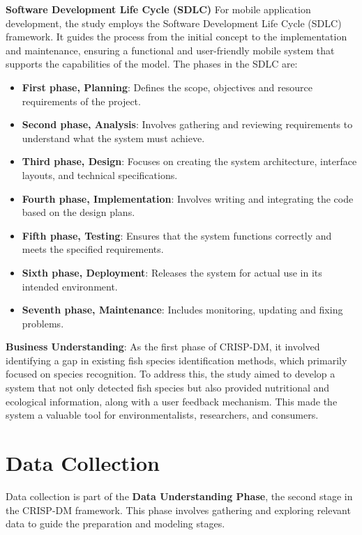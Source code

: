 \noindent\textbf{Software Development Life Cycle (SDLC)}\newline
For mobile application development, the study employs the Software Development Life Cycle (SDLC) framework. It guides the process from the initial concept to the implementation and maintenance, ensuring a functional and user-friendly mobile system that supports the capabilities of the model. The phases in the SDLC are:

\begin{itemize}
    \item\textbf{First phase, Planning}: Defines the scope, objectives and resource requirements of the project.
    \item\textbf{Second phase, Analysis}: Involves gathering and reviewing requirements to understand what the system must achieve.
    \item\textbf{Third phase, Design}: Focuses on creating the system architecture, interface layouts, and technical specifications.
    \item\textbf{Fourth phase, Implementation}: Involves writing and integrating the code based on the design plans.
    \item\textbf{Fifth phase, Testing}: Ensures that the system functions correctly and meets the specified requirements.
    \item\textbf{Sixth phase, Deployment}: Releases the system for actual use in its intended environment.
    \item\textbf{Seventh phase, Maintenance}: Includes monitoring, updating and fixing problems.
\end{itemize}

\noindent\textbf{Business Understanding}:\newline
As the first phase of CRISP-DM, it involved identifying a gap in existing fish species identification methods, which primarily focused on species recognition. To address this, the study aimed to develop a system that not only detected fish species but also provided nutritional and ecological information, along with a user feedback mechanism. This made the system a valuable tool for environmentalists, researchers, and consumers.

\section{Data Collection}
Data collection is part of the \textbf{Data Understanding Phase}, the second stage in the CRISP-DM framework. This phase involves gathering and exploring relevant data to guide the preparation and modeling stages.

